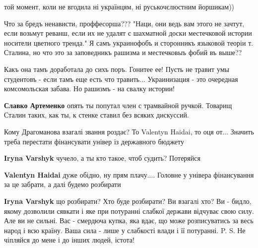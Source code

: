 \begin{itemize}
той момент, коли не вгодила ні українцям, ні руськочєлюстним йоршикам))


Что за бредъ ненависти, проффесорша??? "Наци, они ведь вам этого не зачтут,
если возьмут реванш, если их не удалят с шахматной доски местечковой истории
носители цветного тренда." Я самъ украинофобъ и сторонникъ языковой теоріи т.
Сталина, но что это за заповедникъ рашизма и местечковыъ фобий въ выше?? 

Какъ она тамъ доработала до сихъ поръ. Гонитее ее! Пусть не травит умы
студентовъ - если тамъ еще есть что травить... Украинизация - это очередная
комсомольская забава. Но рашизмъ - на свалку истории!

\begin{itemize}

\textbf{Славко Артеменко} опять ты попутал член с трамвайной ручкой. Товарищ
Сталин таких, как ты, к стенке ставил без всяких дискуссий.
\end{itemize}



Кому Драгоманова взагалі звання роздає? То Valentyn Haidai, то оця от...
Значить треба перестати фінансувати універ із державного бюджету

\begin{itemize}

\textbf{Iryna Varshyk} чучело, а ты кто такое, чтоб судить? Потеряйся


\textbf{Valentyn Haidai} дуже обідно, ну прям плачу.... Головне у універа фінансування за це забрати, а далі будемо розбирати


\textbf{Iryna Varshyk} що розбирати? Хто буде розбирати? Ви взагалі хто? Ви - бидло, якому дозволили сявкати і яке при потуранні слабкої держави відчуває свою силу.
Але ви не сильні. Вас - смердюча купка, яка вдає, що може розписуватись за весь народ і всю країну. Ваша сила - лише у слабкості влади і її потуранні.
P. S. Не чіпляйся до мене і до інших людей, істота!


\end{itemize}
\end{itemize}
